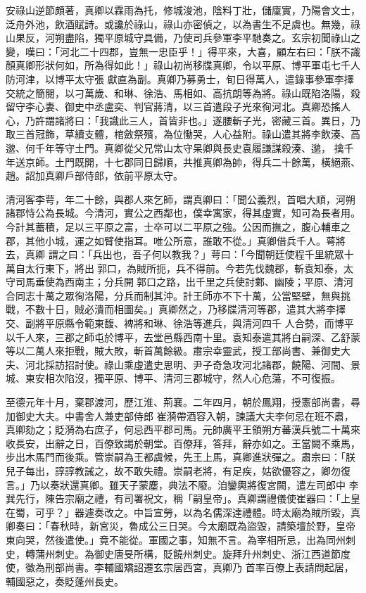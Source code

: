 \begin{pinyinscope}
 安祿山逆節頗著，真卿以霖雨為托，修城浚池，陰料丁壯，儲廩實，乃陽會文士，泛舟外池，飲酒賦詩。或讒於祿山，祿山亦密偵之，以為書生不足虞也。無幾，祿山果反，河朔盡陷，獨平原城守具備，乃使司兵參軍李平馳奏之。玄宗初聞祿山之變，嘆曰：「河北二十四郡，豈無一忠臣乎！」得平來，大喜，顧左右曰：「朕不識顏真卿形狀何如，所為得如此！」祿山初尚移牒真卿，令以平原、博平軍屯七千人防河津，以博平太守張
 獻直為副。真卿乃募勇士，旬日得萬人，遣錄事參軍李擇交統之簡閱，以刁萬歲、和琳、徐浩、馬相如、高抗朗等為將。祿山既陷洛陽，殺留守李心妻、御史中丞盧奕、判官蔣清，以三首遣段子光來徇河北。真卿恐搖人心，乃許謂諸將曰：「我識此三人，首皆非也。」遂腰斬子光，密藏三首。異日，乃取三首冠飾，草續支體，棺斂祭殯，為位慟哭，人心益附。祿山遣其將李飲湊、高邈、何千年等守土門。真卿從父兄常山太守杲卿與長史袁履謙謀殺湊、邈，
 擒千年送京師。土門既開，十七郡同日歸順，共推真卿為帥，得兵二十餘萬，橫絕燕、趙。詔加真卿戶部侍郎，依前平原太守。



 清河客李萼，年二十餘，與郡人來乞師，謂真卿曰：「聞公義烈，首唱大順，河朔諸郡恃公為長城。今清河，實公之西鄰也，僕幸寓家，得其虛實，知可為長者用。今計其蓄積，足以三平原之富，士卒可以二平原之強。公因而撫之，腹心輔車之郡，其他小城，運之如臂使指耳。唯公所意，誰敢不從。」真卿借兵千人。萼將去，真卿
 謂之曰：「兵出也，吾子何以教我？」萼曰：「今聞朝廷使程千里統眾十萬自太行東下，將出郭口，為賊所扼，兵不得前。今若先伐魏郡，斬袁知泰，太守司馬垂使為西南主；分兵開郭口之路，出千里之兵使討鄴、幽陵；平原、清河合同志十萬之眾徇洛陽，分兵而制其沖。計王師亦不下十萬，公當堅壁，無與挑戰，不數十日，賊必潰而相圖矣。」真卿然之，乃移牒清河等郡，遣其大將李擇交、副將平原縣令範東馥、裨將和琳、徐浩等進兵，與清河四千
 人合勢，而博平以千人來，三郡之師屯於博平，去堂邑縣西南十里。袁知泰遣其將白嗣深、乙舒蒙等以二萬人來拒戰，賊大敗，斬首萬餘級。肅宗幸靈武，授工部尚書、兼御史大夫、河北採訪招討使。祿山乘虛遣史思明、尹子奇急攻河北諸郡，饒陽、河間、景城、東安相次陷沒，獨平原、博平、清河三郡城守，然人心危蕩，不可復振。



 至德元年十月，棄郡渡河，歷江淮、荊襄。二年四月，朝於鳳翔，授憲部尚書，尋加御史大夫。中書舍人兼吏部侍郎
 崔漪帶酒容入朝，諫議大夫李何忌在班不肅，真卿劾之；貶漪為右庶子，何忌西平郡司馬。元帥廣平王領朔方蕃漢兵號二十萬來收長安，出辭之日，百僚致謁於朝堂。百僚拜，答拜，辭亦如之。王當闕不乘馬，步出木馬門而後乘。管崇嗣為王都虞候，先王上馬，真卿進狀彈之。肅宗曰：「朕兒子每出，諄諄教誡之，故不敢失禮。崇嗣老將，有足疾，姑欲優容之，卿勿復言。」乃以奏狀還真卿。雖天子蒙塵，典法不廢。洎鑾輿將復宮闕，遣左司郎中
 李巽先行，陳告宗廟之禮，有司署祝文，稱「嗣皇帝」。真卿謂禮儀使崔器曰：「上皇在蜀，可乎？」器遽奏改之。中旨宣勞，以為名儒深達禮體。時太廟為賊所毀，真卿奏曰：「春秋時，新宮災，魯成公三日哭。今太廟既為盜毀，請築壇於野，皇帝東向哭，然後遣使。」竟不能從。軍國之事，知無不言。為宰相所忌，出為同州刺史，轉蒲州刺史。為御史唐旻所構，貶饒州刺史。旋拜升州刺史、浙江西道節度使，徵為刑部尚書。李輔國矯詔遷玄宗居西宮，真卿乃
 首率百僚上表請問起居，輔國惡之，奏貶蓬州長史。




\end{pinyinscope}

